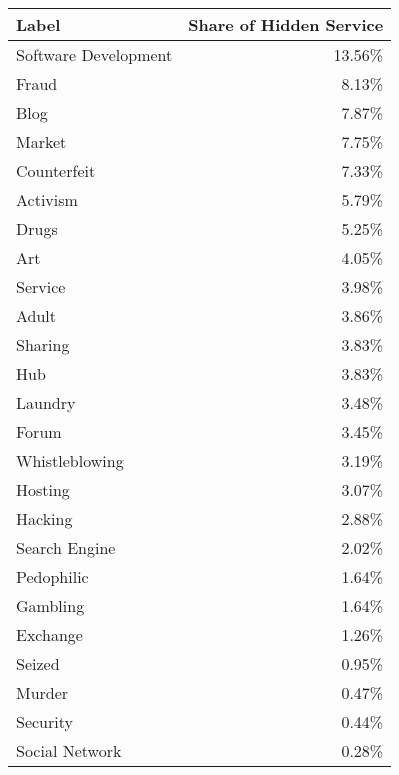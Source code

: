 \iflncs
\begin{center}
    \begin{supertabular*}{\textwidth}{l@{\extracolsep{\fill}}r}
    \textbf{Label}  & \textbf{Share of Hidden Service}\\
    \hline
    \hline
    Software Development	&	13.56\%\\
	\hline
	Fraud		&	8.13\%\\
	\hline
	Blog		&	7.87\%\\
	\hline
	Market		&	7.75\%\\
	\hline
	Counterfeit	&	7.33\%\\
	\hline
	Activism	&	5.79\%\\
	\hline
	Drugs		&	5.25\%\\
	\hline
	Art			&	4.05\%\\
	\hline
	Service		&	3.98\%\\
	\hline
	Adult		&	3.86\%\\
	\hline
	Sharing		&	3.83\%\\
	\hline
	Hub		&	3.83\%\\
	\hline
	Laundry		&	3.48\%\\
	\hline
	Forum		&	3.45\%\\
	\hline
	Whistleblowing			&	3.19\%\\
	\hline
	Hosting		&	3.07\%\\
	\hline
	Hacking		&	2.88\%\\
	\hline
	Search Engine			&	2.02\%\\
	\hline
	Pedophilic	&	1.64\%\\
	\hline
	Gambling	&	1.64\%\\
	\hline
	Exchange	&	1.26\%\\
	\hline
	Seized		&	0.95\%\\
	\hline
	Murder		&	0.47\%\\
	\hline
	Security	&	0.44\%\\
	\hline
	Social Network			&	0.28\%\\
    \end{supertabular*}
\end{center}
\fi
